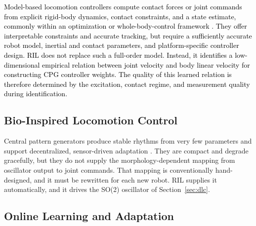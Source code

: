 \documentclass[a4paper, 10pt, conference]{ieeeconf}
\newcommand{\oldtext}[1]{\textcolor{red}{}}
\newcommand{\newtext}[1]{\textcolor{black}{#1}}
\begin{document}
\newtext{Model-based locomotion controllers compute contact forces or joint
commands from explicit rigid-body dynamics, contact constraints, and a state
estimate, commonly within an optimization or whole-body-control framework
\cite{jenelten2019}. They offer interpretable constraints and accurate tracking,
but require a sufficiently accurate robot model, inertial and contact parameters,
and platform-specific controller design. RIL does not replace such a full-order
model. Instead, it identifies a low-dimensional empirical relation between joint
velocity and body linear velocity for constructing CPG controller weights. The
quality of this learned relation is therefore determined by the excitation,
contact regime, and measurement quality during identification.}

\subsection{Bio-Inspired Locomotion Control}

Central pattern generators produce stable rhythms from very few parameters and
support decentralized, sensor-driven adaptation
\cite{ijspeert2008,miguelblanco2020,suzuki2019,szorkovszky2023}. They are compact
and degrade gracefully, but they do not supply the morphology-dependent mapping from
oscillator output to joint commands. That mapping is conventionally
hand-designed, and it must be rewritten for each new robot. RIL supplies it
automatically, and it drives the SO(2) oscillator of Section~\ref{sec:dlc}.

\subsection{Online Learning and Adaptation}

\end{document}
